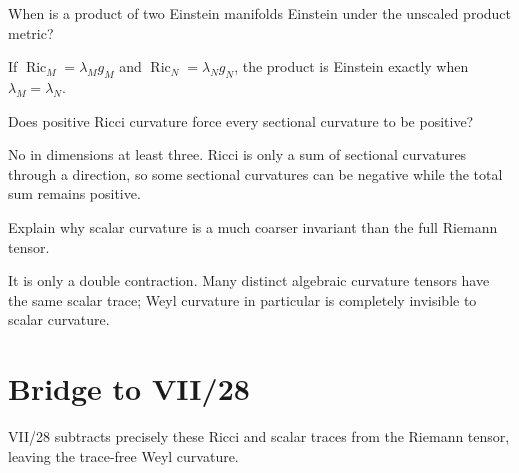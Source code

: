 \begin{problem}\label{prob:vii27-ch03}
When is a product of two Einstein manifolds Einstein under the unscaled product metric?
\end{problem}
\begin{solution}
If \(\operatorname{Ric}_M=\lambda_Mg_M\) and \(\operatorname{Ric}_N=\lambda_Ng_N\), the product is Einstein exactly when \(\lambda_M=\lambda_N\).
\end{solution}

\begin{problem}\label{prob:vii27-ch04}
Does positive Ricci curvature force every sectional curvature to be positive?
\end{problem}
\begin{solution}
No in dimensions at least three. Ricci is only a sum of sectional curvatures through a direction, so some sectional curvatures can be negative while the total sum remains positive.
\end{solution}

\begin{problem}\label{prob:vii27-ch05}
Explain why scalar curvature is a much coarser invariant than the full Riemann tensor.
\end{problem}
\begin{solution}
It is only a double contraction. Many distinct algebraic curvature tensors have the same scalar trace; Weyl curvature in particular is completely invisible to scalar curvature.
\end{solution}

\section*{Bridge to VII/28}
VII/28 subtracts precisely these Ricci and scalar traces from the Riemann tensor, leaving the trace-free Weyl curvature.
